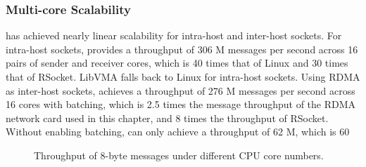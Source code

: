 \subsubsection{Multi-core Scalability}

\sys has achieved nearly linear scalability for intra-host and inter-host sockets. For intra-host sockets, \sys provides a throughput of 306 M messages per second across 16 pairs of sender and receiver cores, which is 40 times that of Linux and 30 times that of RSocket. LibVMA falls back to Linux for intra-host sockets. Using RDMA as inter-host sockets, \sys achieves a throughput of 276 M messages per second across 16 cores with batching, which is 2.5 times the message throughput of the RDMA network card used in this chapter, and 8 times the throughput of RSocket. Without enabling batching, \sys can only achieve a throughput of 62 M, which is 60%

\begin{figure}[htbp]
	
	\caption{Throughput of 8-byte messages under different CPU core numbers.}
	\label{socksdirect:fig:eval-corenum-tput}
\end{figure}


